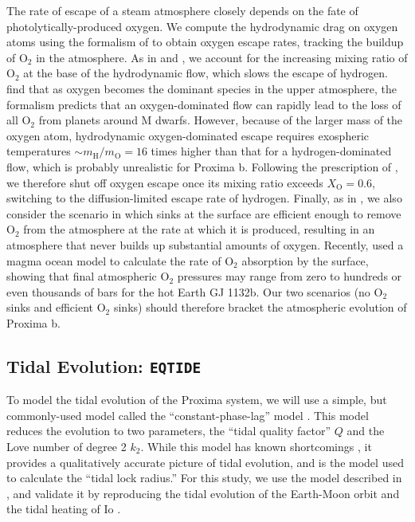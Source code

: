 \documentclass[preprint,12pt]{aastex}
\def\eqtide{\texttt{\footnotesize{EQTIDE}}\xspace}
\begin{document}
The rate of escape of a steam atmosphere closely depends on the fate
of photolytically-produced oxygen. We compute the hydrodynamic drag on
oxygen atoms using the formalism of \cite{Hunten87} to obtain oxygen
escape rates, tracking the buildup of O$_2$ in the atmosphere. As in
\cite{Tian15} and \cite{Schaefer16}, we account for the increasing
mixing ratio of O$_2$ at the base of the hydrodynamic flow, which
slows the escape of hydrogen. \cite{Tian15} find that as oxygen
becomes the dominant species in the upper atmosphere, the
\cite{Hunten87} formalism predicts that an oxygen-dominated flow can
rapidly lead to the loss of all O$_2$ from planets around M
dwarfs. However, because of the larger mass of the oxygen atom,
hydrodynamic oxygen-dominated escape requires exospheric temperatures
$\sim m_\mathrm{H}/m_\mathrm{O} = 16$ times higher than that for a
hydrogen-dominated flow, which is probably unrealistic for Proxima
b. Following the prescription of \cite{Schaefer16}, we therefore
shut off oxygen escape once its mixing ratio exceeds $X_\mathrm{O} =
0.6$, switching to the diffusion-limited escape rate of
hydrogen. Finally, as in \cite{LugerBarnes15}, we also consider the
scenario in which sinks at the surface are efficient enough to remove
O$_2$ from the atmosphere at the rate at which it is produced,
resulting in an atmosphere that never builds up substantial amounts of
oxygen. Recently, \cite{Schaefer16} used a magma ocean model to
calculate the rate of O$_2$ absorption by the surface, showing that
final atmospheric O$_2$ pressures may range from zero to hundreds or
even thousands of bars for the hot Earth GJ 1132b. Our two scenarios
(no O$_2$ sinks and efficient O$_2$ sinks) should therefore bracket
the atmospheric evolution of Proxima b.

\subsection{Tidal Evolution: \eqtide}
\label{sec:models:eqtide}
To model the tidal evolution of the Proxima system, we will use a
simple, but commonly-used model called the ``constant-phase-lag''
model \citep{Goldreich66,Greenberg09,Heller11}. This model reduces the
evolution to two parameters, the ``tidal quality factor'' $Q$ and the
Love number of degree 2 $k_2$. While this model has known shortcomings
\citep{ToumaWisdom94,EfroimskyMakarov13}, it provides a qualitatively
accurate picture of tidal evolution, and is the model \cite{Kasting93}
used to calculate the ``tidal lock radius.'' For this study, we use
the model described in \cite{Heller11}, and validate it by reproducing
the tidal evolution of the Earth-Moon orbit \citep{MacDonald64} and
the tidal heating of Io \citep{Peale79}.
\end{document}
